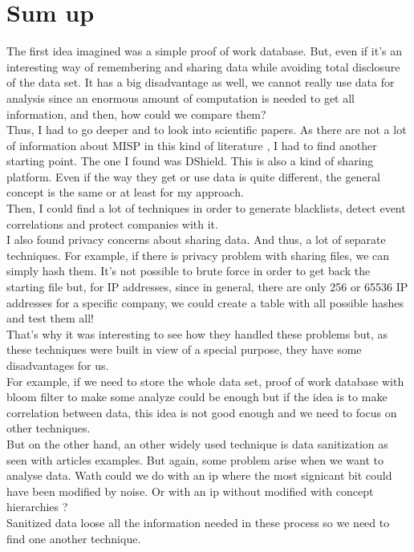 \documentclass{eplmastersthesis}
\begin{document}
\section{Sum up}
The first idea imagined was a simple proof of work database. But, even if it's an interesting way of remembering and sharing data while avoiding total disclosure of the data set. It has a big disadvantage as well, we cannot really use data for analysis since an enormous amount of computation is needed to get all information, and then, how could we compare them?\\
Thus, I had to go deeper and to look into scientific papers. As there are not a lot of information about MISP in this kind of literature , I had to find another starting point. The one I found was DShield. This is also a kind of sharing platform. Even if the way they get or use data is quite different, the general concept is the same or at least for my approach.\\
Then, I could find a lot of techniques in order to generate blacklists, detect event correlations and protect companies with it.\\
I also found privacy concerns about sharing data. And thus, a lot of separate techniques. For example, if there is privacy problem with sharing files, we can simply hash them. It's not possible to brute force in order to get back the starting file but, for IP addresses, since in general, there are only 256 or 65536 IP addresses for a specific company, we could create a table with all possible hashes and test them all!\\
That's why it was interesting to see how they handled these problems but, as these techniques were built in view of a special purpose, they have some disadvantages for us. \\
For example, if we need to store the whole data set, proof of work database with bloom filter to make some analyze could be enough but if the idea is to make correlation between data, this idea is not good enough and we need to focus on other techniques.\\
But on the other hand, an other widely used technique is data sanitization as seen with articles examples. But again, some problem arise when we want to analyse data. Wath could we do with an ip where the most signicant bit could have been modified by noise. Or with an ip without modified with concept hierarchies ? \\
Sanitized data loose all the information needed in these process so we need to find one another technique.\\
\end{document}
